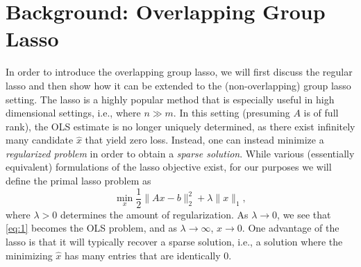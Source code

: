 \documentclass{article}
\begin{document}
\section{Background: Overlapping Group Lasso}
\label{sec:backgr-group-lasso}
In order to introduce the overlapping group lasso, we will first discuss the regular lasso and then show how it can be extended to the (non-overlapping) group lasso setting.
The lasso is a highly popular method that is especially useful in high dimensional settings, i.e., where $n \gg m$.
In this setting (presuming $A$ is of full rank), the OLS estimate is no longer uniquely determined, as there exist infinitely many candidate $\hat{x}$ that yield zero loss.
Instead, one can instead minimize a \emph{regularized problem} in order to obtain a \emph{sparse solution}.
While various (essentially equivalent) formulations of the lasso objective exist, for our purposes we will define the primal lasso problem as
\begin{equation}
  \label{eq:1}
  \operatorname*{min}_x \frac{1}{2} \lVert Ax - b \rVert_2^2 + \lambda \lVert x \rVert_1,
\end{equation}
where $\lambda > 0$ determines the amount of regularization.
As $\lambda \to 0$, we see that \eqref{eq:1} becomes the OLS problem, and as $\lambda \to \infty$, $x \to 0$.
One advantage of the lasso is that it will typically recover a sparse solution, i.e., a solution where the minimizing $\hat{x}$ has many entries that are identically 0.
\end{document}
